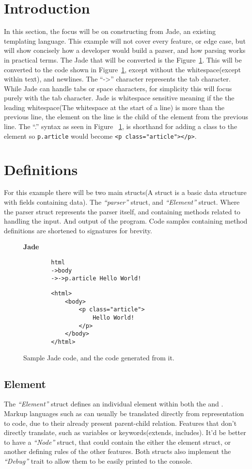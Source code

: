 \section{Introduction}
In this section, the focus will be on constructing  from Jade, an existing templating language. This example will not cover every feature, or edge case, but will show concisely how a developer would build a parser, and how parsing works in practical terms. The Jade that will be converted is the Figure~\ref{fig:html}. This will be converted to the code shown in Figure~\ref{fig:html}, except without the whitespace(except within text), and newlines. The ``->'' character represents the tab character. While Jade can handle tabs or space characters, for simplicity this will focus purely with the tab character. Jade is whitespace sensitive meaning if the the leading whitespace(The whitespace at the start of a line) is more than the previous line, the element on the line is the child of the element from the previous line. The ``.'' syntax as seen in Figure ~\ref{fig:html}, is shorthand for adding a class to the element so \verb|p.article| would become \verb|<p class="article"></p>|.
\newpage
\section{Definitions}
For this example there will be two main structs(A struct is a basic data structure with fields containing data). The \textit{``parser''} struct, and \textit{``Element''} struct. Where the parser struct represents the parser itself, and containing methods related to handling the input. And output of the program. Code samples containing method definitions are shortened to signatures for brevity.
\begin{figure}[!hbtp]
    \Large{\textbf{Jade}}\normalsize
    \begin{verbatim}
        html
        ->body
        ->->p.article Hello World!
    \end{verbatim}
    \Large{\textbf{}}\normalsize
    \begin{verbatim}
        <html>
            <body>
                <p class="article">
                    Hello World!
                </p>
            </body>
        </html>
    \end{verbatim}
    \caption{Sample Jade code, and the  code generated from it.}
    \label{fig:html}
\end{figure}
\newpage
\subsection{Element}
The \textit{``Element''} struct defines an individual element within both the  and . Markup languages such as  can usually be translated directly from  representation to code, due to their already present parent-child relation. Features that don't directly translate, such as variables or keywords(extends, includes). It'd be better to have a \textit{``Node''} struct, that could contain the either the element struct, or another defining rules of the other features. Both structs also implement the \textit{``Debug''} trait to allow them to be easily printed to the console.


